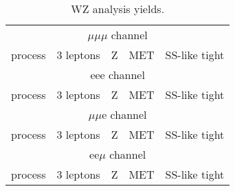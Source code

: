 \documentclass[a4paper]{article}
\begin{document}
\begin{table}[ht]
\begin{center}
\begin{tabular}{l|r|r|r|r}
\hline
\multicolumn{5}{c}{$\mu\mu\mu$ channel}\\
process & 3 leptons & Z & MET & SS-like tight\\
\hline

\hline
\hline
\multicolumn{5}{c}{eee channel}\\
process & 3 leptons & Z & MET & SS-like tight\\
\hline

\hline
\hline
\multicolumn{5}{c}{$\mu\mu$e channel}\\
process & 3 leptons & Z & MET & SS-like tight\\
\hline

\hline
\hline
\multicolumn{5}{c}{ee$\mu$ channel}\\
process & 3 leptons & Z & MET & SS-like tight\\
\hline

\hline
\end{tabular}
\caption{WZ analysis yields.}
\label{tab:wz_yields}
\end{center}
\end{table}
\end{document}
